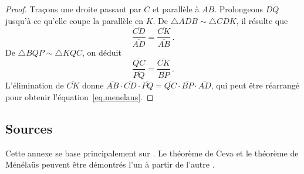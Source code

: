 \begin{proof}
Traçons une droite passant par $C$ et parallèle à $\overline{AB}$. Prolongeons $\overline{DQ}$ jusqu'à ce qu'elle coupe la parallèle en $K$. De $\triangle ADB \sim \triangle CDK$, il résulte que 
\begin{equation*}
\displaystyle\frac{\overline{CD}}{\overline{AD}}=\displaystyle\frac{\overline{CK}}{\overline{AB}}\,.
\end{equation*}
De $\triangle  BQP\sim \triangle KQC$, on déduit
\begin{equation*}
\displaystyle\frac{\overline{QC}}{\overline{PQ}}=\displaystyle\frac{\overline{CK}}{\overline{BP}}\,.
\end{equation*}
L'élimination de  $\overline{CK}$ donne 
$\overline{AB}\cdot\overline{CD}\cdot\overline{PQ}=\overline{QC}\cdot\overline{BP}\cdot\overline{AD}$,  qui peut être réarrangé pour obtenir l'équation~\ref{eq.menelaus}.
\end{proof}


\subsection*{Sources}

Cette annexe se base principalement sur \cite{gelfand}. Le théorème de Ceva et le théorème de Ménélaüs peuvent être démontrés l'un à partir de l'autre \cite{silvester}.
